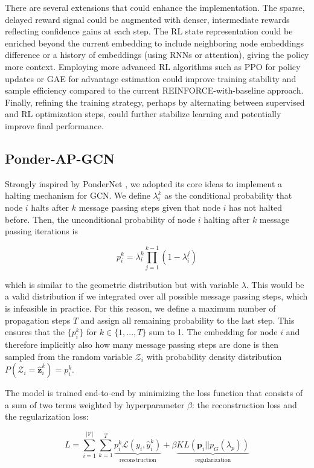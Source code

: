 \documentclass{gdl}
\begin{document}
There are several extensions that could enhance the implementation. The sparse, delayed reward signal could be augmented with denser, intermediate rewards reflecting confidence gains at each step. The RL state representation could be enriched beyond the current embedding to include neighboring node embeddings difference or a history of embeddings (using RNNs or attention), giving the policy more context. Employing more advanced RL algorithms such as PPO for policy updates or GAE for advantage estimation could improve training stability and sample efficiency compared to the current REINFORCE-with-baseline approach. Finally, refining the training strategy, perhaps by alternating between supervised and RL optimization steps, could further stabilize learning and potentially improve final performance.

\subsection{Ponder-AP-GCN}
Strongly inspired by PonderNet \cite{banino2021}, we adopted its core ideas to implement a halting mechanism for GCN. We define $\lambda_i^k$ as the conditional probability that node $i$ halts after $k$ message passing steps given that node $i$ has not halted before. Then, the unconditional probability of node $i$ halting after $k$ message passing iterations is

$$
p_i^k = \lambda_i^k \prod_{j=1}^{k-1} (1-\lambda_i^j)
$$

\noindent which is similar to the geometric distribution but with variable $\lambda$. This would be a valid distribution if we integrated over all possible message passing steps, which is infeasible in practice. For this reason, we define a maximum number of propagation steps $T$ and assign all remaining probability to the last step. This ensures that the $\{p_i^k\}$ for $k\in \{1,...,T\}$ sum to 1. The embedding for node $i$ and therefore implicitly also how many message passing steps are done is then sampled from the random variable $\mathcal{Z}_i$ with probability density distribution $P(\mathcal{Z}_i=\hat{\mathbf{z}}_i^k) = p_i^k$.

The model is trained end-to-end by minimizing the loss function that consists of a sum of two terms weighted by hyperparameter $\beta$: the reconstruction loss and the regularization loss:

\begin{equation}
L = \sum_{i=1}^{\mathcal{|V|}} \sum_{k=1}^{T} \underbrace{p_i^k \mathcal{L}(y_i, \hat{y}_i^k)}_{\text{reconstruction}} + \beta \underbrace{KL(\mathbf{p}_i || p_G(\lambda_p))}_{\text{regularization}}
\label{eq:ponder-loss}
\end{equation}
\end{document}
